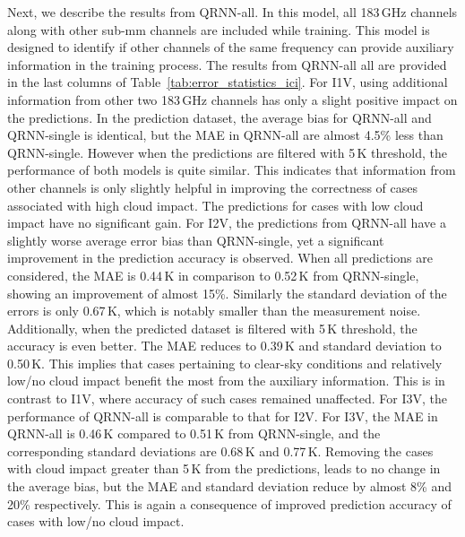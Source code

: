 \documentclass[amt, manuscript]{copernicus}
\begin{document}
Next, we describe the results from QRNN-all. In this model, all 183\,GHz channels along with other sub-mm channels are included while training. This model is designed to identify if other channels of the same frequency can provide auxiliary information in the training process. The results from QRNN-all all are provided in the last columns of Table~\ref{tab:error_statistics_ici}. For I1V, using additional information from other two 183\,GHz channels has only a slight positive impact on the predictions. In the prediction dataset, the average bias for QRNN-all and QRNN-single is identical, but the MAE in QRNN-all are almost 4.5\% less than QRNN-single. However when the predictions are filtered with 5\,K threshold, the performance of both models is quite similar. This indicates that information from other channels is only slightly helpful in improving the correctness of cases associated with high cloud impact. The predictions for cases with low cloud impact have no significant gain. For I2V, the predictions from QRNN-all have a slightly worse average error bias than QRNN-single, yet a significant improvement in the prediction accuracy is observed. When all predictions are considered, the MAE is 0.44\,K in comparison to 0.52\,K from QRNN-single, showing an improvement of almost 15\%. Similarly the standard deviation of the errors is only 0.67\,K, which is notably smaller than the measurement noise. Additionally, when the predicted dataset is filtered with 5\,K threshold, the accuracy is even better. The MAE reduces to 0.39\,K and standard deviation to 0.50\,K. This implies that cases pertaining to clear-sky conditions and relatively low/no cloud impact benefit the most from the auxiliary information. This is in contrast to I1V, where accuracy of such cases remained unaffected. For I3V, the performance of QRNN-all is comparable to that for I2V. For I3V, the MAE in QRNN-all is 0.46\,K compared to 0.51\,K from QRNN-single, and the corresponding standard deviations are 0.68\,K and 0.77\,K. Removing the cases with cloud impact greater than 5\,K from the predictions, leads to no change in the average bias, but the MAE and standard deviation reduce by almost  8\% and 20\% respectively. This is again a consequence of improved prediction accuracy of cases with low/no cloud impact.  
\end{document}
